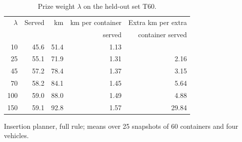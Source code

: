 \begin{table}[!htbp]
\caption{Prize weight $\lambda$ on the held-out set T60.}
\label{tab:lambda}
\centering
\small
\begin{tabular}{rrrrr}
\toprule
$\lambda$ & Served & km & km per container & Extra km per extra \\
 & & & served & container served \\
\midrule
10 & 45.6 & 51.4 & 1.13 &  \\
25 & 55.1 & 71.9 & 1.31 & 2.16 \\
45 & 57.2 & 78.4 & 1.37 & 3.15 \\
70 & 58.2 & 84.1 & 1.45 & 5.64 \\
100 & 59.0 & 88.0 & 1.49 & 4.88 \\
150 & 59.1 & 92.8 & 1.57 & 29.84 \\
\bottomrule
\end{tabular}
\par\smallskip\footnotesize Insertion planner, full rule; means over 25 snapshots of 60 containers and four vehicles.
\end{table}
